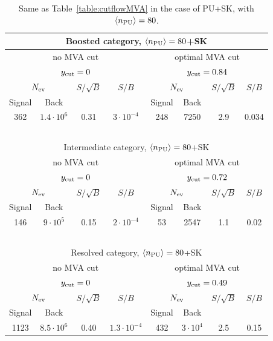 \begin{table}[t]
  \centering
  \small
  \begin{tabular}{c|c|c|c||c|c|c|c}
    \hline
    \multicolumn{8}{c}{Boosted category, $\left\langle n_{\rm PU}\right\rangle=80$+SK}\\
    \hline
     \multicolumn{4}{c||}{no MVA cut} & \multicolumn{4}{c}{optimal MVA cut}\\
    \multicolumn{4}{c||}{$y_{\rm cut}=0$} & \multicolumn{4}{c}{$y_{\rm cut}=0.84$}\\
    \hline
    \multicolumn{2}{c|}{$N_{\rm ev}$} &  $S/\sqrt{B}$  & $S/B$
    & \multicolumn{2}{c|}{$N_{\rm ev}$} &  $S/\sqrt{B}$  & $S/B$\\
        Signal & Back   &     &   &  Signal & Back   &     &    \\
    \hline
    362  &  $1.4\cdot 10^6$     & 0.31       &  $3\cdot 10^{-4}$ &
    248     &   7250             &  2.9       & 0.034 \\
    \hline
       \multicolumn{8}{c}{$\quad$}\\
    \hline
    \multicolumn{8}{c}{Intermediate category,  $\left\langle n_{\rm PU}\right\rangle=80$+SK}\\
    \hline
    \multicolumn{4}{c||}{no MVA cut} & \multicolumn{4}{c}{optimal MVA cut}\\
    \multicolumn{4}{c||}{$y_{\rm cut}=0$} & \multicolumn{4}{c}{$y_{\rm cut}=0.72$}\\
    \hline
    \multicolumn{2}{c|}{$N_{\rm ev}$} &  $S/\sqrt{B}$  & $S/B$
    & \multicolumn{2}{c|}{$N_{\rm ev}$} &  $S/\sqrt{B}$  & $S/B$\\
        Signal & Back   &     &   &  Signal & Back   &     &    \\
    \hline
    146  &    $9\cdot 10^5$   & 0.15        &  $2\cdot 10^{-4}$      &
  53  &  2547        & 1.1        &  0.02 \\
  \hline
  \multicolumn{8}{c}{$\quad$}\\
    \hline
    \multicolumn{8}{c}{Resolved category,  $\left\langle n_{\rm PU}\right\rangle=80$+SK}\\
    \hline
     \multicolumn{4}{c||}{no MVA cut} & \multicolumn{4}{c}{optimal MVA cut}\\
    \multicolumn{4}{c||}{$y_{\rm cut}=0$} & \multicolumn{4}{c}{$y_{\rm cut}=0.49$}\\
    \hline
    \multicolumn{2}{c|}{$N_{\rm ev}$} &  $S/\sqrt{B}$  & $S/B$
    & \multicolumn{2}{c|}{$N_{\rm ev}$} &  $S/\sqrt{B}$  & $S/B$\\
        Signal & Back   &     &   &  Signal & Back   &     &    \\
    \hline
  1123  &    $8.5\cdot 10^6$   & 0.40       &  $1.3\cdot 10^{-4}$       &
  432  &  $3\cdot 10^4$        &   2.5      & 0.15 \\
        \hline
  \end{tabular}
  \caption{\small Same as Table~\ref{table:cutflowMVA} in the case
    of PU+SK, with $\left\langle n_{\rm PU}\right\rangle=80$.
        \label{table:cutflowMVA_PU}
  }
\end{table}

